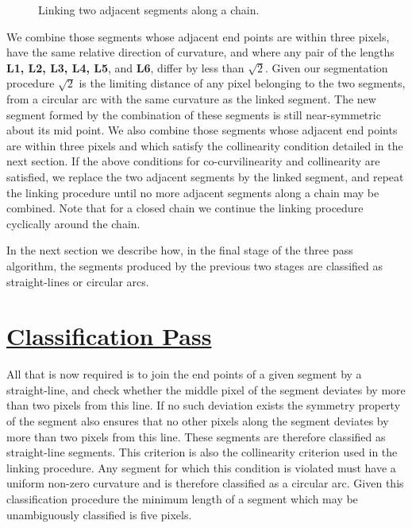 \begin{figure}[htbp]
\vspace*{-15mm}
\vspace*{6cm}
\caption{Linking two adjacent segments along a chain.}
\label{fig:linking}
\end{figure}

  We combine those segments whose adjacent end points are within three pixels, 
have the same relative direction of curvature, and where any pair of the 
lengths {\bf L1, L2, L3, L4, L5}, and {\bf L6}, differ by less than 
$\sqrt{2}$. Given our segmentation procedure $\sqrt{2}$ is the limiting 
distance of any pixel belonging to the two segments, from a circular arc with 
the same curvature as the linked segment. The new segment formed by the 
combination of these segments is 
still near-symmetric about its mid point. We also combine those segments whose 
adjacent end points are within three pixels and which satisfy the 
collinearity condition detailed in the next section. If the above conditions 
for co-curvilinearity and collinearity are satisfied, we replace the two 
adjacent segments by the linked segment, and repeat the linking procedure 
until no more adjacent segments along a chain may be combined. Note that for a 
closed chain we continue the linking procedure cyclically around the chain.

 In the next section we describe how, in the final stage of the three pass 
algorithm, the segments produced by the previous two stages are classified 
as straight-lines or circular arcs.

\section{\underline{Classification Pass}}

 All that is now required is to join the end points of a given segment by a 
straight-line, and check whether the middle pixel of the segment deviates by 
more than two pixels from this line. If no such deviation exists the symmetry 
property of the segment also ensures that no other pixels along the segment 
deviates by more than two pixels from this line. These segments are therefore 
classified as straight-line segments. This criterion is also the collinearity
criterion used in the linking procedure. Any segment for which this condition 
is violated must have a uniform non-zero curvature and is therefore 
classified as a circular arc. Given this classification procedure the minimum 
length of a segment which may be unambiguously classified is five pixels.

